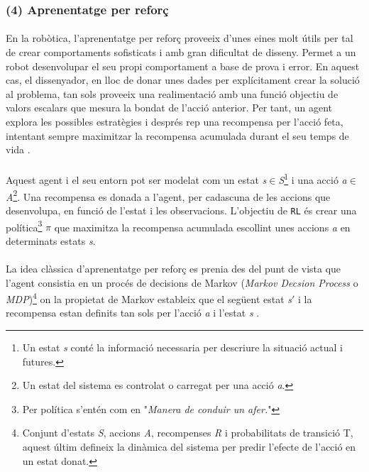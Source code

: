 \documentclass[12pt,a4paper,final,twoside]{article}
\begin{document}
\subsubsection*{(4) Aprenentatge per reforç}

\paragraph{}En la robòtica, l'aprenentatge per reforç proveeix d'unes eines molt útils per tal de crear comportaments sofisticats i amb gran dificultat de disseny. Permet a un robot desenvolupar el seu propi comportament a base de prova i error. En aquest cas, el dissenyador, en lloc de donar unes dades per explícitament crear la solució al problema, tan sols proveeix una realimentació amb una funció objectiu de valors escalars que mesura la bondat de l'acció anterior. Per tant, un agent explora les possibles estratègies i després rep una recompensa per l'acció feta, intentant sempre maximitzar la recompensa acumulada durant el seu temps de vida \cite{Kober2009}.

\paragraph{}Aquest agent i el seu entorn pot ser modelat com un estat \textit{s}$\in$\textit{S}\footnote{Un estat \textit{s} conté la informació necessaria per descriure la situació actual i futures.} i una acció \textit{a}$\in$\textit{A}\footnote{Un estat del sistema es controlat o carregat per una acció \textit{a}.}. Una recompensa es donada a l'agent, per cadascuna de les accions que desenvolupa, en funció de l'estat i les observacions. L'objectiu de \texttt{RL} és crear una política\footnote{Per política s'entén com en \cite{iec-dlc} "\textit{Manera de conduir un afer.}"} $\pi$ que maximitza la recompensa acumulada escollint unes accions \textit{a} en determinats estats \textit{s}.

\paragraph{}La idea clàssica d'aprenentatge per reforç es prenia des del punt de vista que l'agent consistia en un procés de decisions de Markov (\textit{Markov Decsion Process} o \textit{MDP})\footnote{Conjunt d'estats \textit{S}, accions \textit{A}, recompenses \textit{R} i probabilitats de transició T, aquest últim defineix la dinàmica del sistema per predir l'efecte de l'acció en un estat donat.} on la propietat de Markov estableix que el següent estat \textit{s}$'$ i la recompensa estan definits tan sols per l'acció \textit{a} i l'estat \textit{s} \cite{Sutton1998}. %
\end{document}
